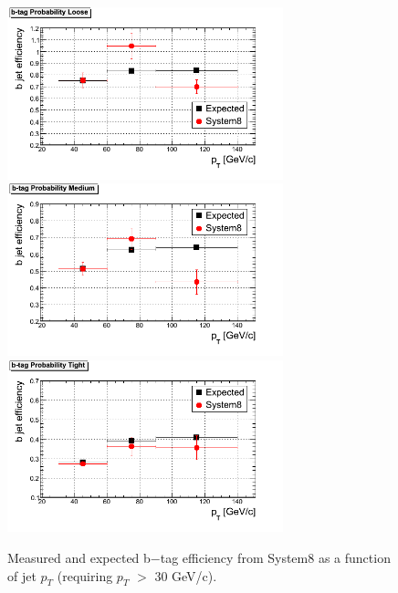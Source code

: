 \begin{figure}[htbp]
  \begin{center}
    \includegraphics[width=80mm]{Figures/JPL_Tag.png}
    \includegraphics[width=80mm]{Figures/JPM_Tag.png}
    \includegraphics[width=80mm]{Figures/JPT_Tag.png}
  \end{center}
  \caption{Measured and expected b$-$tag efficiency from System8 as a function of jet $p_T $ (requiring $p_T $ $> $ 30 GeV/c).}
  \label{fig:S8_JP_results}
\end{figure}

\clearpage


